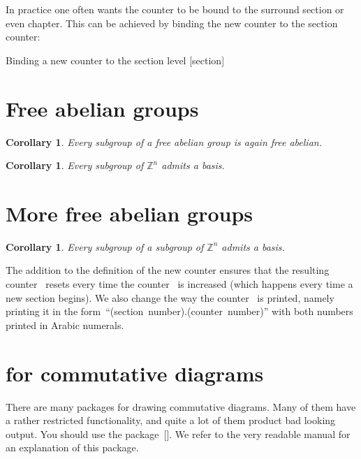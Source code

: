 In practice one often wants the counter to be bound to the surround section or even chapter.
This can be achieved by binding the new counter to the section counter:
\begin{showlatex}[
  before lower = {\stoptoc},
  after lower = {\starttoc \addtocounter{section}{-2}}
]{Binding a new counter to the section level}
[section]
\renewcommand{\thesometheorems}{\thesection.\arabic{sometheorems}}
\newtheorem{corollary}[sometheorems]{Corollary}

\section{Free abelian groups}

\begin{corollary}
  Every subgroup of a free abelian group is again free abelian.
\end{corollary}

\begin{corollary}
  Every subgroup of $\mathbb{Z}^n$ admits a basis.
\end{corollary}

\section{More free abelian groups}

\begin{corollary}
  Every subgroup of a subgroup of $\mathbb{Z}^n$ admits a basis.
\end{corollary}
\end{showlatex}
The addition \inlinecode{[section]} to the definition of the new counter ensures that the resulting counter~ resets every time the counter~ is increased (which happens every time a new section begins).
We also change the way the counter~ is printed, namely printing it in the form~\enquote{(section~number).(counter~number)} with both numbers printed in Arabic numerals.





\section{ for commutative diagrams}

There are many packages for drawing commutative diagrams.
Many of them have a rather restricted functionality, and quite a lot of them product bad looking output.
You should use the package~[\packname].
We refer to the very readable manual \cite{tikz-cd} for an explanation of this package.





